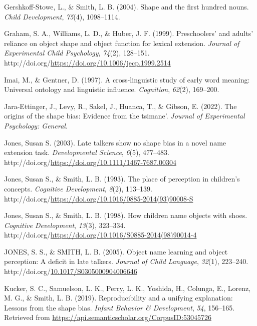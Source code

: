 \documentclass[10pt, letterpaper]{article}
\begin{document}
\begin{CSLReferences}{1}{0}
Gershkoff-Stowe, L., \& Smith, L. B. (2004). Shape and the first hundred
nouns. \emph{Child Development}, \emph{75}(4), 1098--1114.

Graham, S. A., Williams, L. D., \& Huber, J. F. (1999). Preschoolers'
and adults' reliance on object shape and object function for lexical
extension. \emph{Journal of Experimental Child Psychology},
\emph{74}(2), 128--151.
http://doi.org/\url{https://doi.org/10.1006/jecp.1999.2514}

Imai, M., \& Gentner, D. (1997). A cross-linguistic study of early word
meaning: Universal ontology and linguistic influence. \emph{Cognition},
\emph{62}(2), 169--200.

Jara-Ettinger, J., Levy, R., Sakel, J., Huanca, T., \& Gibson, E.
(2022). The origins of the shape bias: Evidence from the tsimane'.
\emph{Journal of Experimental Psychology: General}.

Jones, Susan S. (2003). Late talkers show no shape bias in a novel name
extension task. \emph{Developmental Science}, \emph{6}(5), 477--483.
http://doi.org/\url{https://doi.org/10.1111/1467-7687.00304}

Jones, Susan S., \& Smith, L. B. (1993). The place of perception in
children's concepts. \emph{Cognitive Development}, \emph{8}(2),
113--139.
http://doi.org/\url{https://doi.org/10.1016/0885-2014(93)90008-S}

Jones, Susan S., \& Smith, L. B. (1998). How children name objects with
shoes. \emph{Cognitive Development}, \emph{13}(3), 323--334.
http://doi.org/\url{https://doi.org/10.1016/S0885-2014(98)90014-4}

JONES, S. S., \& SMITH, L. B. (2005). Object name learning and object
perception: A deficit in late talkers. \emph{Journal of Child Language},
\emph{32}(1), 223--240.
http://doi.org/\href{https://doi.org/10.1017/S0305000904006646}{10.1017/S0305000904006646}

Kucker, S. C., Samuelson, L. K., Perry, L. K., Yoshida, H., Colunga, E.,
Lorenz, M. G., \& Smith, L. B. (2019). Reproducibility and a unifying
explanation: Lessons from the shape bias. \emph{Infant Behavior \&
Development}, \emph{54}, 156--165. Retrieved from
\url{https://api.semanticscholar.org/CorpusID:53045726}


\end{CSLReferences}
\end{document}
